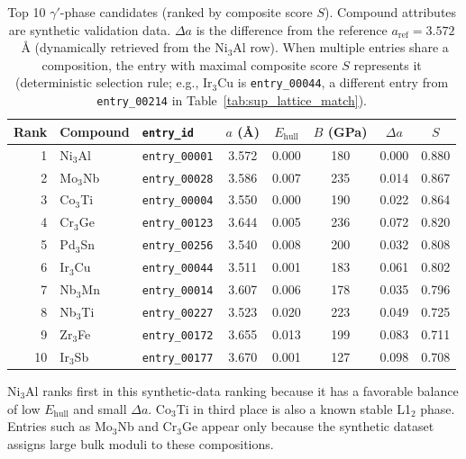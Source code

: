 \begin{table}[t]
  \centering
  \caption{Top 10 $\gamma'$-phase candidates (ranked by composite score $S$). Compound attributes are synthetic validation data. $\Delta a$ is the difference from the reference $a_{\text{ref}}=3.572$~\AA{}{} (dynamically retrieved from the Ni$_3$Al row). When multiple entries share a composition, the entry with maximal composite score $S$ represents it (deterministic selection rule; e.g., Ir$_3$Cu is \texttt{entry\_00044}, a different entry from \texttt{entry\_00214} in Table~\ref{tab:sup_lattice_match}).}
  \label{tab:gamma_prime}
  \small
  \begin{tabular}{rllcccc c}
    \toprule
    Rank & Compound & \texttt{entry\_id} & $a$ (\AA{}{}) & $E_\text{hull}$ & $B$ (GPa) & $\Delta a$ & $S$ \\
    \midrule
    1 & Ni$_3$Al & \texttt{entry\_00001} & 3.572 & 0.000 & 180 & 0.000 & 0.880 \\
    2 & Mo$_3$Nb & \texttt{entry\_00028} & 3.586 & 0.007 & 235 & 0.014 & 0.867 \\
    3 & Co$_3$Ti & \texttt{entry\_00004} & 3.550 & 0.000 & 190 & 0.022 & 0.864 \\
    4 & Cr$_3$Ge & \texttt{entry\_00123} & 3.644 & 0.005 & 236 & 0.072 & 0.820 \\
    5 & Pd$_3$Sn & \texttt{entry\_00256} & 3.540 & 0.008 & 200 & 0.032 & 0.808 \\
    6 & Ir$_3$Cu & \texttt{entry\_00044} & 3.511 & 0.001 & 183 & 0.061 & 0.802 \\
    7 & Nb$_3$Mn & \texttt{entry\_00014} & 3.607 & 0.006 & 178 & 0.035 & 0.796 \\
    8 & Nb$_3$Ti & \texttt{entry\_00227} & 3.523 & 0.020 & 223 & 0.049 & 0.725 \\
    9 & Zr$_3$Fe & \texttt{entry\_00172} & 3.655 & 0.013 & 199 & 0.083 & 0.711 \\
    10 & Ir$_3$Sb & \texttt{entry\_00177} & 3.670 & 0.001 & 127 & 0.098 & 0.708 \\
    \bottomrule
  \end{tabular}
\end{table}

Ni$_3$Al ranks first in this synthetic-data ranking because it has a favorable balance of low $E_\text{hull}$ and small $\Delta a$. Co$_3$Ti in third place is also a known stable L1$_2$ phase. Entries such as Mo$_3$Nb and Cr$_3$Ge appear only because the synthetic dataset assigns large bulk moduli to these compositions.

